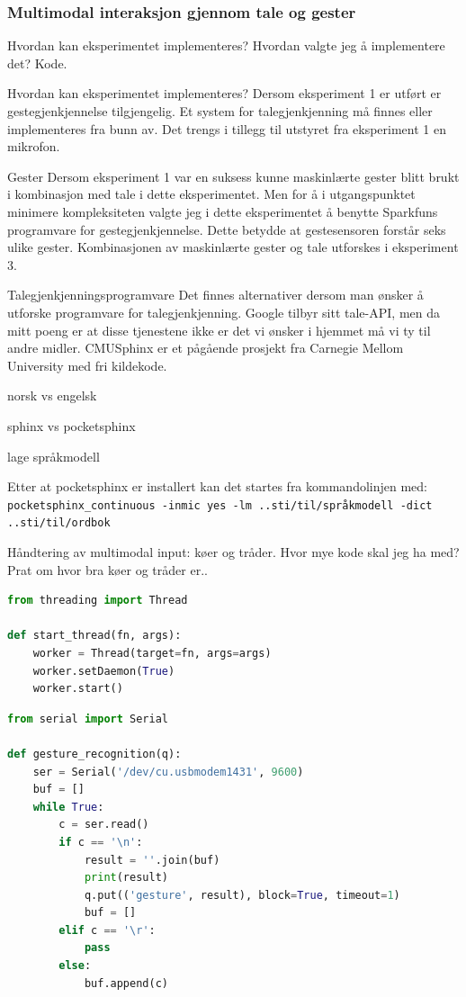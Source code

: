 \subsubsection{Multimodal interaksjon gjennom tale og gester}
{\color{red}Hvordan kan eksperimentet implementeres? Hvordan valgte jeg å implementere det? Kode.}

{\color{red}Hvordan kan eksperimentet implementeres?}
Dersom eksperiment 1 er utført er gestegjenkjennelse tilgjengelig. Et system for talegjenkjenning må finnes eller implementeres fra bunn av. Det trengs i tillegg til utstyret fra eksperiment 1 en mikrofon.

{\color{red}Gester}
Dersom eksperiment 1 var en suksess kunne maskinlærte gester blitt brukt i kombinasjon med tale i dette eksperimentet. Men for å i utgangspunktet minimere kompleksiteten valgte jeg i dette eksperimentet å benytte Sparkfuns programvare for gestegjenkjennelse. Dette betydde at gestesensoren forstår seks ulike gester. Kombinasjonen av maskinlærte gester og tale utforskes i eksperiment 3.

{\color{red}Talegjenkjenningsprogramvare}
Det finnes alternativer dersom man ønsker å utforske programvare for talegjenkjenning. Google tilbyr sitt tale-API, men da mitt poeng er at disse tjenestene ikke er det vi ønsker i hjemmet må vi ty til andre midler. CMUSphinx er et pågående prosjekt fra Carnegie Mellom University med fri kildekode.

norsk vs engelsk

sphinx vs pocketsphinx

lage språkmodell

Etter at pocketsphinx er installert kan det startes fra kommandolinjen med:
\verb|pocketsphinx_continuous -inmic yes -lm ..sti/til/språkmodell -dict ..sti/til/ordbok|

{\color{red}Håndtering av multimodal input: køer og tråder. Hvor mye kode skal jeg ha med?}
Prat om hvor bra køer og tråder er..

\begin{lstlisting}[language=Python, caption=Kode Python bakgrunnstråd]
from threading import Thread

def start_thread(fn, args):
    worker = Thread(target=fn, args=args)
    worker.setDaemon(True)
    worker.start()
\end{lstlisting}

\begin{lstlisting}[language=Python, caption=Geste-data]
from serial import Serial

def gesture_recognition(q):
    ser = Serial('/dev/cu.usbmodem1431', 9600)
    buf = []
    while True:
        c = ser.read()
        if c == '\n':
            result = ''.join(buf)
            print(result)
            q.put(('gesture', result), block=True, timeout=1)
            buf = []
        elif c == '\r':
            pass
        else:
            buf.append(c)
\end{lstlisting}

